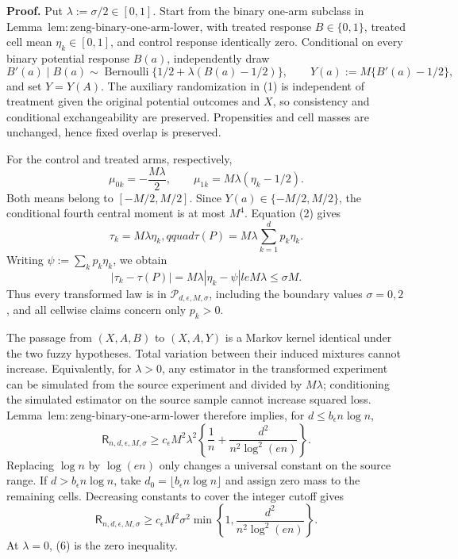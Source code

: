 \textbf{Proof.}
Put \(\lambda:=\sigma/2\in[0,1]\).  Start from the binary one-arm subclass in Lemma~\(\mathrm{lem:zeng\text{-}binary\text{-}one\text{-}arm\text{-}lower}\), with treated response \(B\in\{0,1\}\), treated cell mean \(\eta_k\in[0,1]\), and control response identically zero.  Conditional on every binary potential response \(B(a)\), independently draw
\[
 B'(a)\mid B(a)\sim\operatorname{Bernoulli}\{1/2+\lambda(B(a)-1/2)\},
 \qquad Y(a):=M\{B'(a)-1/2\},
\tag{1}
\]
and set \(Y=Y(A)\).  The auxiliary randomization in (1) is independent of treatment given the original potential outcomes and \(X\), so consistency and conditional exchangeability are preserved.  Propensities and cell masses are unchanged, hence fixed overlap is preserved.

For the control and treated arms, respectively,
\[
 \mu_{0k}=-\frac{M\lambda}{2},\qquad
 \mu_{1k}=M\lambda(\eta_k-1/2).
\tag{2}
\]
Both means belong to \([-M/2,M/2]\).  Since \(Y(a)\in\{-M/2,M/2\}\), the conditional fourth central moment is at most \(M^4\).  Equation (2) gives
\[
 \tau_k=M\lambda\eta_k,qquad
 \tau(P)=M\lambda\sum_{k=1}^dp_k\eta_k.
\tag{3}
\]
Writing \(\psi:=\sum_kp_k\eta_k\), we obtain
\[
 |\tau_k-\tau(P)|=M\lambda|\eta_k-\psi|le M\lambda\le\sigma M.
\tag{4}
\]
Thus every transformed law is in \(\mathcal P_{d,\epsilon,M,\sigma}\), including the boundary values \(\sigma=0,2\), and all cellwise claims concern only \(p_k>0\).

The passage from \((X,A,B)\) to \((X,A,Y)\) is a Markov kernel identical under the two fuzzy hypotheses.  Total variation between their induced mixtures cannot increase.  Equivalently, for \(\lambda>0\), any estimator in the transformed experiment can be simulated from the source experiment and divided by \(M\lambda\); conditioning the simulated estimator on the source sample cannot increase squared loss.  Lemma~\(\mathrm{lem:zeng\text{-}binary\text{-}one\text{-}arm\text{-}lower}\) therefore implies, for \(d\le b_{\epsilon}n\log n\),
\[
 \mathsf R_{n,d,\epsilon,M,\sigma}
 \ge c_{\epsilon}M^2\lambda^2\left\{\frac1n+\frac{d^2}{n^2\log^2(en)}\right\}.
\tag{5}
\]
Replacing \(\log n\) by \(\log(en)\) only changes a universal constant on the source range.  If \(d>b_{\epsilon}n\log n\), take \(d_0=\lfloor b_{\epsilon}n\log n\rfloor\) and assign zero mass to the remaining cells.  Decreasing constants to cover the integer cutoff gives
\[
 \mathsf R_{n,d,\epsilon,M,\sigma}
 \ge c_{\epsilon}M^2\sigma^2
 \min\left\{1,\frac{d^2}{n^2\log^2(en)}\right\}.
\tag{6}
\]
At \(\lambda=0\), (6) is the zero inequality.

